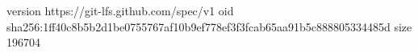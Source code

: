 version https://git-lfs.github.com/spec/v1
oid sha256:1ff40c8b5b2d1be0755767af10b9ef778ef3f3fcab65aa91b5c888805334485d
size 196704
